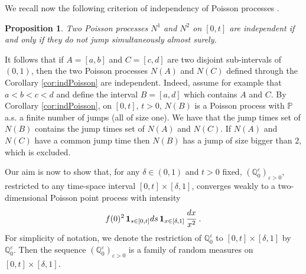 \documentclass[reqno, 12pt, a4paper]{amsart}
\theoremstyle{plain}
\newtheorem{proposition}[theorem]{Proposition}
\theoremstyle{definition}
\begin{document}
We recall now the following criterion of independency of Poisson processes .

\begin{proposition}{\cite[Ch. XII, Proposition 1.7]{RY13}}
\label{prop:RY}
Two Poisson processes $N^1$ and $N^2$ on $[0,t]$ are independent if and only if they do not jump simultaneously almost surely.
\end{proposition}

It follows that if $A=[a,b]$ and $C=[c,d]$ are two disjoint sub-intervals of $(0,1)$, then the two Poisson processes $N(A)$ and $N(C)$ defined through the Corollary \ref{cor:indPoisson} are independent. Indeed, assume for example that $a<b<c<d$ and define the interval $B=[a,d]$ which contains $A$ and $C$. By Corollary \ref{cor:indPoisson}, on $[0,t]$, $t>0$, $N(B)$ is a Poisson process with $\mathbb P$ a.s. a finite number of jumps (all of size one). We have that the jump times set of $N(B)$ contains the jump times set of $N(A)$ and $N(C)$. If $N(A)$ and $N(C)$ have a common jump time then $N(B)$ has a jump of size bigger than $2$, which is excluded.

\bigskip

Our aim is now to show that, for any $\delta \in (0,1)$ and $t>0$ fixed,  $(\mathbb Q^\varepsilon_0)_{\varepsilon>0}$, restricted to any time-space interval $[0,t] \times [\delta, 1]$,  converges weakly to a two-dimensional Poisson point process with intensity 
\begin{equation}
\begin{split}
f(0)^2 \,  {\bf 1}_{s \in [0,t]} ds  \, {\bf 1}_{x \in [\delta,1]} \, \cfrac{dx}{x^2} \ .
\end{split}
\end{equation}
For simplicity of notation, we denote the restriction of $\mathbb Q^\varepsilon_0$ to $[0,t] \times [\delta, 1]$ by $\mathbb Q^\varepsilon_0$. Then the sequence $(\mathbb Q^\varepsilon_0)_{\varepsilon>0}$ is a family of random measures on $[0,t] \times [\delta, 1]$.

\bigskip 
\end{document}

